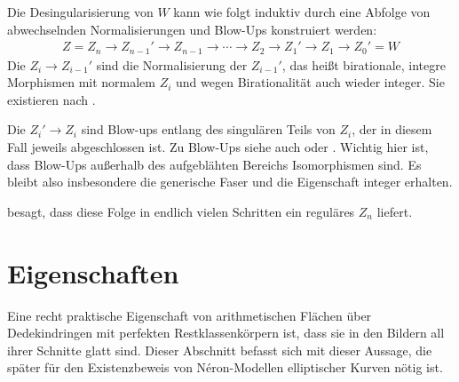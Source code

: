 \begin{Bemerkung}\label{bem:konstruktioneigmodell}
  Die Desingularisierung von $W$ kann wie folgt induktiv durch
  eine Abfolge von abwechselnden Normalisierungen und Blow-Ups
  konstruiert werden:
  \begin{gather*}
    Z=Z_{n}\to Z_{n-1}'\to Z_{n-1}\to\dotsb
    \to Z_{2}\to Z_{1}'\to Z_{1}\to Z_{0}'=W
  \end{gather*}
  Die $Z_i\to Z_{i-1}'$ sind die Normalisierung der $Z_{i-1}'$,
  das heißt birationale, integre Morphismen mit normalem $Z_{i}$ 
  und wegen Birationalität auch wieder integer. Sie existieren nach
  \cite[Proposition~4.1.22]{liu}.
  
  Die $Z_{i}'\to Z_{i}$ sind Blow-ups entlang des singulären Teils von
  $Z_{i}$, der in diesem Fall jeweils abgeschlossen ist.
  Zu Blow-Ups siehe auch
  \cite[Chapter~8.1]{liu} oder \cite[Chapter~13.19]{wedhorn}.
  Wichtig hier ist, dass Blow-Ups außerhalb des aufgeblähten Bereichs
  Isomorphismen sind. Es bleibt also insbesondere die generische Faser
  und die Eigenschaft integer erhalten.

  \cite[Corollary~8.3.51]{liu} besagt, dass diese Folge in endlich
  vielen Schritten ein reguläres $Z_{n}$ liefert.
\end{Bemerkung}

\section{Eigenschaften}
Eine recht praktische Eigenschaft von arithmetischen Flächen über
Dedekindringen mit perfekten Restklassenkörpern ist, dass
sie in den Bildern all ihrer Schnitte glatt sind.
Dieser Abschnitt befasst sich mit dieser Aussage, die später für
den Existenzbeweis von Néron-Modellen elliptischer Kurven nötig
ist.


